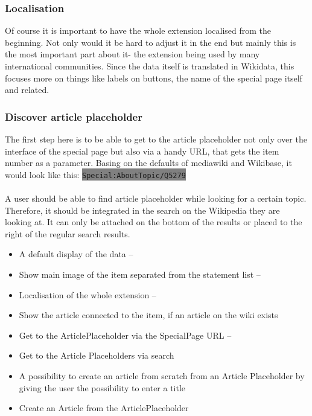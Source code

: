 \documentclass[11pt]{article}
\begin{document}
\subsubsection{Localisation}
Of course it is important to have the whole extension localised from the beginning. Not only would it be hard to adjust it in the end but mainly this is the most important part about it- the extension being used by many international communities. Since the data itself is translated in Wikidata, this focuses more on things like labels on buttons, the name of the special page itself and related. \\
\subsubsection{Discover article placeholder}
The first step here is to be able to get to the article placeholder not only over the interface of the special page but also via a handy URL, that gets the item number as a parameter. Basing on the defaults of mediawiki and Wikibase, it would look like this: \colorbox{Gray}{\lstinline[basicstyle=\ttfamily\color{white}]|Special:AboutTopic/Q5279|} \\
\\
A user should be able to find article placeholder while looking for a certain topic. Therefore, it should be integrated in the search on the Wikipedia they are looking at. It can only be attached on the bottom of the results or placed to the right of the regular search results. 



\begin{itemize}
\item A default display of the data -- 
\item Show main image of the item separated from the statement list -- 
\item Localisation of the whole extension -- 
\item Show the article connected to the item, if an article on the wiki exists
\item Get to the ArticlePlaceholder via the SpecialPage URL --
\item Get to the Article Placeholders via search
\item A possibility to create an article from scratch from an Article Placeholder by giving the user the possibility to enter a title

\item Create an Article from the ArticlePlaceholder
\end{itemize} 
 
\end{document}
